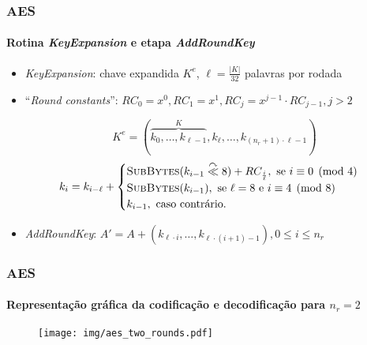 \documentclass[12pt]{beamer}
\newcommand{\length}[1]{\vert #1 \vert}
\begin{document}
\begin{frame}
    \frametitle{AES}
    \framesubtitle{Rotina \emph{KeyExpansion} e etapa \emph{AddRoundKey}}
          \begin{itemize}
            \item \emph{KeyExpansion}: chave expandida $K^e$, $\ell = \frac{\length{K}}{32}$ palavras por rodada
            \item ``\emph{Round constants}'':
                $RC_0 = x^0, RC_1 = x^1, RC_j = x^{j-1} \cdot RC_{j-1}, j > 2$
        
                $$K^e = (\overbrace{k_0, \dots, k_{\ell - 1}}^{K}, k_{\ell}, \dots, k_{(n_r + 1) \cdot \ell - 1})$$
                \begin{equation*}
  k_i = k_{i - \ell} + 
    \begin{cases}
      \textsc{SubBytes}(k_{i - 1} \stackrel{\curvearrowright}{\ll} 8) + RC_{\frac{i}{\ell}},
        \text{ se } i \equiv 0 \pmod{4} \\
      \textsc{SubBytes}(k_{i - 1}),
        \text{ se } \ell = 8 \text { e } i \equiv 4 \pmod{8} \\
      k_{i - 1}, \text{ caso contrário.}
    \end{cases}
\end{equation*}
        \item \emph{AddRoundKey}: $A' = A + (k_{\ell \cdot i}, \dots, k_{\ell \cdot (i + 1) - 1}), 0 \leq i \leq n_r$
          \end{itemize}
\end{frame}

\begin{frame}
    \frametitle{AES}
    \framesubtitle{Representação gráfica da codificação e decodificação para $n_r = 2$}
    \begin{figure}
        \centering
        \texttt{[image: img/aes\_two\_rounds.pdf]}
        \label{fig:my_label}
    \end{figure}
\end{frame}
\end{document}
